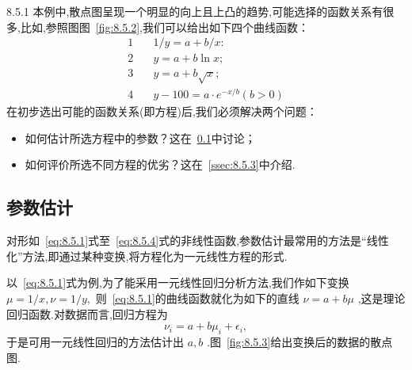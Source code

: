 \begin{example}{}{8.5.1}
    本例中,散点图呈现一个明显的向上且上凸的趋势,可能选择的函数关系有很多,比如,参照图图~\ref{fig:8.5.2},我们可以给出如下四个曲线函数：
    \begin{align}
    1 &\quad 1 / y=a+b / x : \\ 
    2  &\quad  y=a+b \ln x ;  \\ 
    3  &\quad  y=a+b \sqrt{x} ;  \\ 
    4  &\quad  y-100=a \cdot e^{-x / b}(b>0)
    \end{align}
    在初步选出可能的函数关系(即方程)后,我们必须解决两个问题：
    \begin{itemize}
        \item 如何估计所选方程中的参数？这在~\ref{ssec:8.5.2}中讨论；
        \item 如何评价所选不同方程的优劣？这在~\ref{ssec:8.5.3}中介绍.
    \end{itemize}
\end{example}

\subsection{参数估计}\label{ssec:8.5.2}

对形如~\ref{eq:8.5.1}式至~\ref{eq:8.5.4}式的非线性函数,参数估计最常用的方法是“线性化”方法,即通过某种变换,将方程化为一元线性方程的形式.

以~\ref{eq:8.5.1}式为例,为了能采用一元线性回归分析方法,我们作如下变换 $\mu =1/x,\nu =1/y,$ 
则~\ref{eq:8.5.1}的曲线函数就化为如下的直线 $\nu=a+b\mu $ ,这是理论回归函数.对数据而言,回归方程为
\begin{equation}
\nu_i=a+b\mu_i+\epsilon_i,
\end{equation}
于是可用一元线性回归的方法估计出 $a,b$ .图~\ref{fig:8.5.3}给出变换后的数据的散点图.


